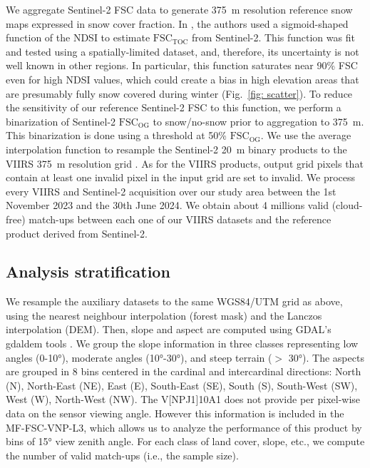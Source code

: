 \documentclass[tc, manuscript]{copernicus}
\begin{document}
We aggregate Sentinel-2 FSC data to generate 375~m resolution reference snow maps expressed in snow cover fraction.  In \citep{gascoin_estimating_2020}, the authors used a sigmoid-shaped function of the NDSI to estimate $\mathrm{FSC_{TOC}}$ from Sentinel-2. This function was fit and tested using a spatially-limited dataset, and, therefore, its uncertainty is not well known in other regions. In particular, this function saturates near 90\% FSC even for high NDSI values, which could create a bias in high elevation areas that are presumably fully snow covered during winter (Fig.~\ref{fig: scatter}). To reduce the sensitivity of our reference Sentinel-2 FSC to this function, we perform a binarization of Sentinel-2 $\mathrm{FSC_{OG}}$ to snow/no-snow prior to aggregation to 375~m. This binarization is done using a threshold at 50\% $\mathrm{FSC_{OG}}$. We use the average interpolation function to resample the Sentinel-2 20~m binary products to the VIIRS 375~m resolution grid \citep{gdal}. As for the VIIRS products, output grid pixels that contain at least one invalid pixel in the input grid are set to invalid. 
We process every VIIRS and Sentinel-2 acquisition over our study area between the 1st November 2023 and the 30th June 2024. We obtain about 4 millions valid (cloud-free) match-ups between each one of our VIIRS datasets and the reference product derived from Sentinel-2.  

 
\subsection{Analysis stratification} 
\label{subsec: obs_classes}

We resample the auxiliary datasets to the same WGS84/UTM grid as above, using the nearest neighbour interpolation (forest mask) and the Lanczos interpolation (DEM). Then, slope and aspect are computed using GDAL's gdaldem tools \citep{gdal}. We group the slope information in three classes representing low angles (0-10°), moderate angles (10°-30°), and steep terrain ($>$ 30°). The aspects are grouped in 8 bins centered in the cardinal and intercardinal directions: North (N), North-East (NE), East (E), South-East (SE), South (S), South-West (SW), West (W), North-West (NW). The V[NP\textbar J1]10A1 does not provide per pixel-wise data on the sensor viewing angle. However this information is included in the MF-FSC-VNP-L3, which allows us to analyze the performance of this product by bins of 15° view zenith angle. For each class of land cover, slope, etc., we compute the number of valid match-ups (i.e., the sample size). 
\end{document}
